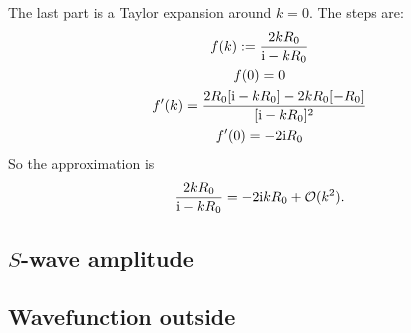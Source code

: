 \documentclass[11pt, english, fleqn, DIV=15, headinclude, BCOR=1.5cm]{scrartcl}
\begin{document}
The last part is a Taylor expansion around $k = 0$. The steps are:
\begin{gather*}
    f(k) := \frac{2 k R_0}{\mathrm i - k R_0} \\ 
    f(0) = 0 \\
    f'(k) = \frac{2 R_0 [\mathrm i - kR_0] - 2 k R_0[-R_0]}{[\mathrm i - kR_0]^2} \\
    f'(0) = - 2 \mathrm i R_0
\end{gather*}
So the approximation is
\[
    \frac{2 k R_0}{\mathrm i - k R_0}
    = - 2 \mathrm i k R_0 + \mathcal O(k^2).
\]

\subsection{$S$-wave amplitude}

\subsection{Wavefunction outside}
\end{document}
